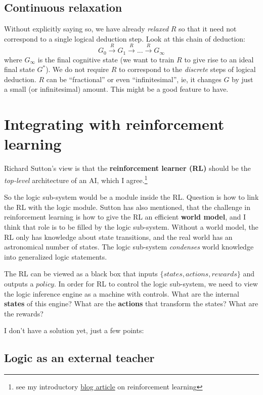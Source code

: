 \documentclass[12pt]{article}
\begin{document}
\subsection{Continuous relaxation}

Without explicitly saying so, we have already \textit{relaxed} $R$ so that it need not correspond to a single logical deduction step.  Look at this chain of deduction:
$$ G_0 \stackrel{R}{\longrightarrow} G_1 \stackrel{R}{\longrightarrow} ... \stackrel{R}{\longrightarrow} G_\infty $$
where $G_\infty$ is the final cognitive state (we want to train $R$ to give rise to an ideal final state $G^*$).  We do not require $R$ to correspond to the \textit{discrete} steps of logical deduction.  $R$ can be ``fractional'' or even ``infinitesimal'', ie, it changes $G$ by just a small (or infinitesimal) amount.  This might be a good feature to have.

\section{Integrating with reinforcement learning}

Richard Sutton's view is that the \textbf{reinforcement learner (RL)} should be the \textit{top-level} architecture of an AI, which I agree.\footnote{see my introductory \href{http://geniferology.blogspot.hk/2015/05/what-is-reinforcement-learning.html}{blog article} on reinforcement learning}

So the logic sub-system would be a module inside the RL.  Question is how to link the RL with the logic module.  Sutton has also mentioned, that the challenge in reinforcement learning is how to give the RL an efficient \textbf{world model}, and I think that role is to be filled by the logic sub-system.  Without a world model, the RL only has knowledge about state transitions, and the real world has an astronomical number of states.  The logic sub-system \textit{condenses} world knowledge into generalized logic statements.

The RL can be viewed as a black box that inputs $\{ states, actions, rewards \}$ and outputs a $policy$.  In order for RL to control the logic sub-system, we need to view the logic inference engine as a machine with controls.  What are the internal \textbf{states} of this engine?  What are the \textbf{actions} that transform the states?  What are the rewards?

I don't have a solution yet, just a few points:

\subsection{Logic as an external teacher}
\end{document}
